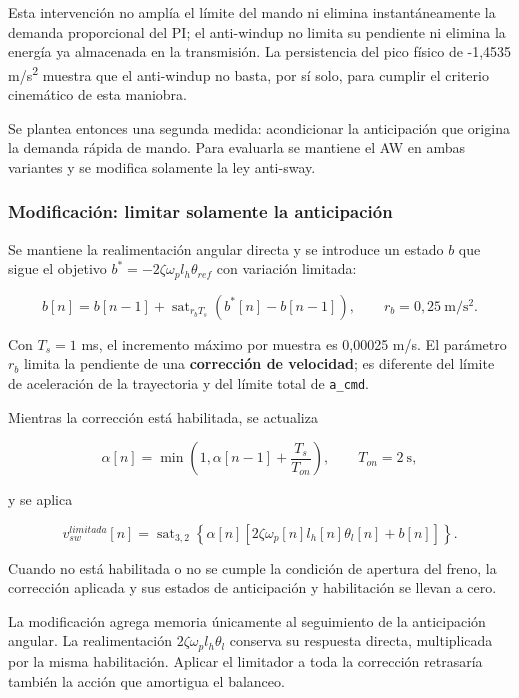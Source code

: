 \documentclass[a4paper,10pt,onecolumn,journal]{ieeeconf}
\numberwithin{equation}{section}
\begin{document}
Esta intervención no amplía el límite del mando ni elimina instantáneamente la demanda proporcional del PI; el anti-windup no limita su pendiente ni elimina la energía ya almacenada en la transmisión. La persistencia del pico físico de -1,4535 m/s\textsuperscript{2} muestra que el anti-windup no basta, por sí solo, para cumplir el criterio cinemático de esta maniobra.

Se plantea entonces una segunda medida: acondicionar la anticipación que origina la demanda rápida de mando. Para evaluarla se mantiene el AW en ambas variantes y se modifica solamente la ley anti-sway.
\subsubsection{Modificación: limitar solamente la anticipación}

Se mantiene la realimentación angular directa y se introduce un estado $b$ que sigue el objetivo $b^*=-2\zeta\omega_p l_h\theta_{ref}$ con variación limitada:

\begin{equation}
b[n]=b[n-1]+\operatorname{sat}_{r_bT_s}\left(b^*[n]-b[n-1]\right),
\qquad r_b=0,25\ \mathrm{m/s^2}.
\end{equation}

Con $T_s=1$ ms, el incremento máximo por muestra es 0,00025 m/s. El parámetro $r_b$ limita la pendiente de una \textbf{corrección de velocidad}; es diferente del límite de aceleración de la trayectoria y del límite total de \texttt{a\_cmd}.

Mientras la corrección está habilitada, se actualiza

\begin{equation}
\alpha[n]=\min\left(1,\alpha[n-1]+\frac{T_s}{T_{on}}\right),\qquad T_{on}=2\ \mathrm{s},
\end{equation}

y se aplica

\begin{equation}
\boxed{v_{sw}^{limitada}[n]=\operatorname{sat}_{3,2}\left\{\alpha[n]\left[2\zeta\omega_p[n]l_h[n]\theta_l[n]+b[n]\right]\right\}.}
\end{equation}

Cuando no está habilitada o no se cumple la condición de apertura del freno, la corrección aplicada y sus estados de anticipación y habilitación se llevan a cero.

La modificación agrega memoria únicamente al seguimiento de la anticipación angular. La realimentación $2\zeta\omega_p l_h\theta_l$ conserva su respuesta directa, multiplicada por la misma habilitación. Aplicar el limitador a toda la corrección retrasaría también la acción que amortigua el balanceo.
\end{document}
